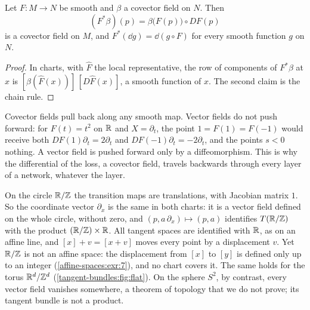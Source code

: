 \begin{notechapter}
\begin{proposition}
\label{tangent-bundles:prop:pullback}
Let $F:M\to N$ be smooth and $\beta$ a covector field on $N$. Then
\[
  (F^*\beta)(p) = \beta\bigl(F(p)\bigr)\circ DF(p)
\]
is a covector field on $M$, and $F^*(\dd g) = \dd(g\circ F)$ for every
smooth function $g$ on $N$.
\end{proposition}

\begin{proof}
In charts, with $\hat F$ the local representative, the row of components
of $F^*\beta$ at $x$ is $[\beta(\hat F(x))]\,[D\hat F(x)]$, a smooth
function of $x$. The second claim is the chain rule.
\end{proof}

\begin{pitfall}
Covector fields pull back along any smooth map. Vector fields do not
push forward: for $F(t) = t^2$ on $\mathbb{R}$ and $X = \partial_t$, the point
$1 = F(1) = F(-1)$ would receive both $DF(1)\partial_t = 2\partial_t$ and
$DF(-1)\partial_t = -2\partial_t$, and the points $s < 0$ nothing. A
vector field is pushed forward only by a diffeomorphism. This is why the
differential of the loss, a covector field, travels backwards through
every layer of a network, whatever the layer.
\end{pitfall}

\begin{example}\label{tangent-bundles:ex:flat}
On the circle $\mathbb{R}/\mathbb{Z}$ the transition maps are translations, with
Jacobian matrix $1$. So the coordinate vector $\partial_x$ is the same in
both charts: it is a vector field defined on the whole circle, without
zero, and $(p, a\,\partial_x)\mapsto(p, a)$ identifies $T(\mathbb{R}/\mathbb{Z})$ with
the product $(\mathbb{R}/\mathbb{Z})\times\mathbb{R}$. All tangent spaces are identified with
$\mathbb{R}$, as on an affine line, and $[x] + v = [x + v]$ moves every point by
a displacement $v$. Yet $\mathbb{R}/\mathbb{Z}$ is not an affine space: the displacement
from $[x]$ to $[y]$ is defined only up to an integer
(\cref{affine-spaces:exr:7}), and no chart covers it. The same holds for
the torus $\mathbb{R}^d/\mathbb{Z}^d$ (\cref{tangent-bundles:fig:flat}). On the sphere
$S^2$, by contrast, every vector field vanishes somewhere, a theorem of
topology that we do not prove; its tangent bundle is not a product.
\end{example}


\end{notechapter}
